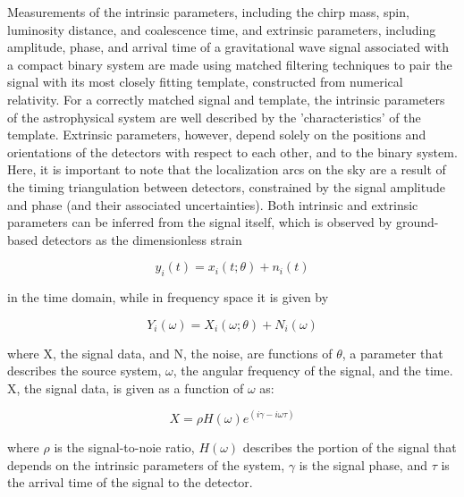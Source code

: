 \documentclass{article}
\begin{document}
Measurements of the intrinsic parameters, including the chirp mass, spin, luminosity distance, and coalescence time, and extrinsic parameters, including amplitude, phase, and arrival time of a gravitational wave signal associated with a compact binary system are made using matched filtering techniques to pair the signal with its most closely fitting template, constructed from numerical relativity.  For a correctly matched signal and template, the intrinsic parameters of the astrophysical system are well described by the 'characteristics' of the template.  Extrinsic parameters, however, depend solely on the positions and orientations of the detectors with respect to each other, and to the binary system.  Here, it is important to note that the localization arcs on the sky are a result of the timing triangulation between detectors, constrained by the signal amplitude and phase (and their associated uncertainties).  Both intrinsic and extrinsic parameters can be inferred from the signal itself, which is observed by ground-based detectors as the dimensionless strain

\begin{equation}    y_i(t) = x_i(t;\theta) + n_i(t) \end{equation}

in the time domain, while in frequency space it is given by 

\begin{equation} Y_i(\omega) = X_i(\omega; \theta) + N_i(\omega) \end{equation}

where X, the signal data, and N, the noise, are functions of $\theta$, a parameter that describes the source system, $\omega$, the angular frequency of the signal, and the time. X, the signal data, is given as a function of $\omega$ as:

\begin{equation} X = \rho H(\omega)e^{(i\gamma - i\omega\tau)} \end{equation}

where $\rho$ is the signal-to-noie ratio, $H(\omega)$ describes the portion of the signal that depends on the intrinsic parameters of the system, $\gamma$ is the signal phase, and $\tau$ is the arrival time of the signal to the detector.
\end{document}
